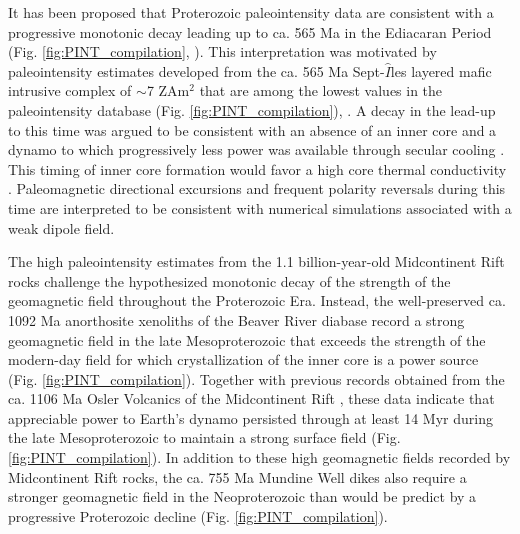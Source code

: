 \documentclass[9pt,twocolumn,twoside,lineno]{pnas-new}
\begin{document}
It has been proposed that Proterozoic paleointensity data are consistent with a progressive monotonic decay leading up to ca. 565 Ma in the Ediacaran Period (Fig. \ref{fig:PINT_compilation}, \citealp{Bono2019a}). This interpretation was motivated by paleointensity estimates developed from the ca. 565 Ma Sept-$\hat{I}$les layered mafic intrusive complex of $\sim$7 ZAm$^2$ that are among the lowest values in the paleointensity database (Fig. \ref{fig:PINT_compilation}), \citealp{Bono2019a}. A decay in the lead-up to this time was argued to be consistent with an absence of an inner core and a dynamo to which progressively less power was available through secular cooling \cite{Bono2019a, Davies2021a}. This timing of inner core formation would favor a high core thermal conductivity \cite[e.g.][]{Ohta2016a}. Paleomagnetic directional excursions \cite{Halls2015a} and frequent polarity reversals \cite{Kodama2021a} during this time are interpreted to be consistent with numerical simulations \cite{Driscoll2016a} associated with a weak dipole field. 

The high paleointensity estimates from the 1.1 billion-year-old Midcontinent Rift rocks challenge the hypothesized monotonic decay of the strength of the geomagnetic field throughout the Proterozoic Era. Instead, the well-preserved ca. 1092 Ma anorthosite xenoliths of the Beaver River diabase record a strong geomagnetic field in the late Mesoproterozoic that exceeds the strength of the modern-day field for which crystallization of the inner core is a power source (Fig. \ref{fig:PINT_compilation}). Together with previous records obtained from the ca. 1106 Ma Osler Volcanics of the Midcontinent Rift \cite{Sprain2018a}, these data indicate that appreciable power to Earth's dynamo persisted through at least 14 Myr during the late Mesoproterozoic to maintain a strong surface field (Fig. \ref{fig:PINT_compilation}). In addition to these high geomagnetic fields recorded by Midcontinent Rift rocks, the ca. 755 Ma Mundine Well dikes \cite{Lloyd2021b} also require a stronger geomagnetic field in the Neoproterozoic than would be predict by a progressive Proterozoic decline (Fig. \ref{fig:PINT_compilation}). 
\end{document}
